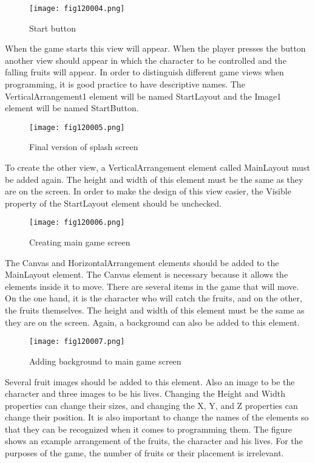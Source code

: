 \begin{figure}[H]
   \centering
   \texttt{[image: fig120004.png]}
   \caption{Start button}
\label{fig120004}
\end{figure}

When the game starts this view will appear. When the player presses the button another view should appear in which the character to be controlled and the falling fruits will appear. In order to distinguish different game views when programming, it is good practice to have descriptive names. The VerticalArrangement1 element will be named StartLayout and the Image1 element will be named StartButton.

\begin{figure}[H]
   \centering
   \texttt{[image: fig120005.png]}
   \caption{Final version of splash screen}
\label{fig120005}
\end{figure}

To create the other view, a VerticalArrangement element called MainLayout must be added again. The height and width of this element must be the same as they are on the screen. In order to make the design of this view easier, the Visible property of the StartLayout element should be unchecked.

\begin{figure}[H]
   \centering
   \texttt{[image: fig120006.png]}
   \caption{Creating main game screen}
\label{fig120006}
\end{figure}

The Canvas and HorizontalArrangement elements should be added to the MainLayout element.
The Canvas element is necessary because it allows the elements inside it to move. There are several items in the game that will move. On the one hand, it is the character who will catch the fruits, and on the other, the fruits themselves.
The height and width of this element must be the same as they are on the screen. Again, a background can also be added to this element.

\begin{figure}[H]
   \centering
   \texttt{[image: fig120007.png]}
   \caption{Adding background to main game screen}
\label{fig120007}
\end{figure}

Several fruit images should be added to this element. Also an image to be the character and three images to be his lives. Changing the Height and Width properties can change their sizes, and changing the X, Y, and Z properties can change their position. It is also important to change the names of the elements so that they can be recognized when it comes to programming them.
The figure shows an example arrangement of the fruits, the character and his lives. For the purposes of the game, the number of fruits or their placement is irrelevant.

